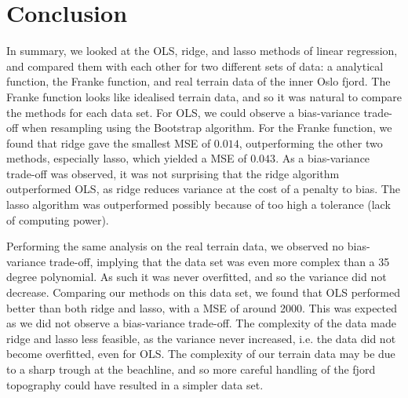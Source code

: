 \section{Conclusion}
\label{sec:conclusion}


In summary, we looked at the OLS, ridge, and lasso methods of linear regression, and compared them with each other for two different sets of data: a analytical function, the Franke function, and real terrain data of the inner Oslo fjord. The Franke function looks like idealised terrain data, and so it was natural to compare the methods for each data set. For OLS, we could observe a bias-variance trade-off when resampling using the Bootstrap algorithm. For the Franke function, we found that ridge gave the smallest MSE of $0.014$, outperforming the other two methods, especially lasso, which yielded a MSE of $0.043$. As a bias-variance trade-off was observed, it was not surprising that the ridge algorithm outperformed OLS, as ridge reduces variance at the cost of a penalty to bias. The lasso algorithm was outperformed possibly because of too high a tolerance (lack of computing power).

Performing the same analysis on the real terrain data, we observed no bias-variance trade-off, implying that the data set was even more complex than a 35 degree polynomial. As such it was never overfitted, and so the variance did not decrease. Comparing our methods on this data set, we found that OLS performed better than both ridge and lasso, with a MSE of around 2000. This was expected as we did not observe a bias-variance trade-off. The complexity of the data made ridge and lasso less feasible, as the variance never increased, i.e. the data did not become overfitted, even for OLS. The complexity of our terrain data may be due to a sharp trough at the beachline, and so more careful handling of the fjord topography could have resulted in a simpler data set.
